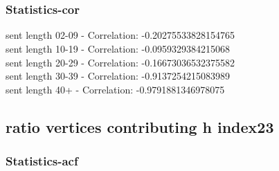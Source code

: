 \documentclass{article}%
\begin{document}
\begin{figure}[ht]%
\centering%
\setlength{\abovecaptionskip}{-35pt}%
%
%
\\%
%
%
\\%
%
\end{figure}

%
\newpage%
\subsubsection{Statistics{-}cor}%
\label{ssubsec:Statistics{-}cor}%
\noindent%
sent length 02-09 - Correlation: -0.20275533828154765\\%
sent length 10-19 - Correlation: -0.0959329384215068\\%
sent length 20-29 - Correlation: -0.16673036532375582\\%
sent length 30-39 - Correlation: -0.9137254215083989\\%
sent length 40+ - Correlation: -0.9791881346978075\\

%
\newpage

%
\subsection{ratio vertices contributing h index23}%
\label{subsec:ratioverticescontributinghindex23}%
\subsubsection{Statistics{-}acf}%
\label{ssubsec:Statistics{-}acf}%
\end{document}
